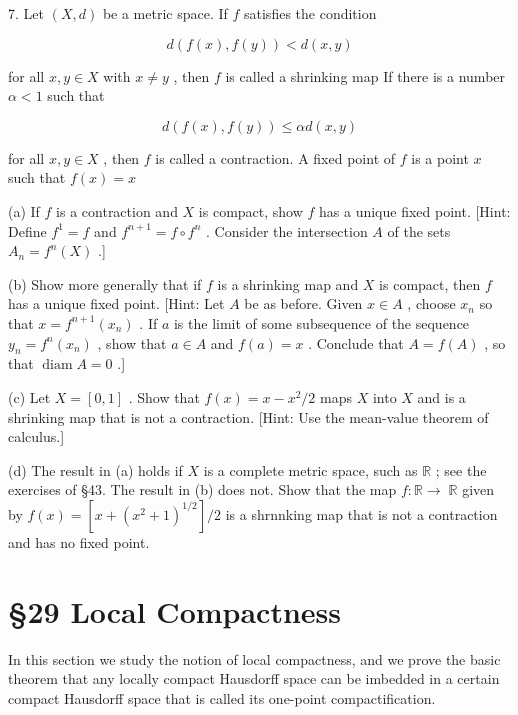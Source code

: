 \documentclass[10pt]{article}
\begin{document}
7. Let \(\left( {X,d}\right)\) be a metric space. If \(f\) satisfies the condition

\[
d\left( {f\left( x\right) ,f\left( y\right) }\right)  < d\left( {x,y}\right)
\]

for all \(x,y \in  X\) with \(x \neq  y\) , then \(f\) is called a shrinking map If there is a number \(\alpha  < 1\) such that

\[
d\left( {f\left( x\right) ,f\left( y\right) }\right)  \leq  {\alpha d}\left( {x,y}\right)
\]

for all \(x,y \in  X\) , then \(f\) is called a contraction. A fixed point of \(f\) is a point \(x\) such that \(f\left( x\right)  = x\)

(a) If \(f\) is a contraction and \(X\) is compact, show \(f\) has a unique fixed point. [Hint: Define \({f}^{1} = f\) and \({f}^{n + 1} = f \circ  {f}^{n}\) . Consider the intersection \(A\) of the sets \({A}_{n} = {f}^{n}\left( X\right)\) .]

(b) Show more generally that if \(f\) is a shrinking map and \(X\) is compact, then \(f\) has a unique fixed point. [Hint: Let \(A\) be as before. Given \(x \in  A\) , choose \({x}_{n}\) so that \(x = {f}^{n + 1}\left( {x}_{n}\right)\) . If \(a\) is the limit of some subsequence of the sequence \({y}_{n} = {f}^{n}\left( {x}_{n}\right)\) , show that \(a \in  A\) and \(f\left( a\right)  = x\) . Conclude that \(A = f\left( A\right)\) , so that \(\operatorname{diam}A = 0\) .]

(c) Let \(X = \left\lbrack  {0,1}\right\rbrack\) . Show that \(f\left( x\right)  = x - {x}^{2}/2\) maps \(X\) into \(X\) and is a shrinking map that is not a contraction. [Hint: Use the mean-value theorem of calculus.]

(d) The result in (a) holds if \(X\) is a complete metric space, such as \(\mathbb{R}\) ; see the exercises of §43. The result in (b) does not. Show that the map \(f : \mathbb{R} \rightarrow \; \mathbb{R}\) given by \(f\left( x\right)  = \left\lbrack  {x + {\left( {x}^{2} + 1\right) }^{1/2}}\right\rbrack  /2\) is a shrnnking map that is not a contraction and has no fixed point.

\section*{§29 Local Compactness}

In this section we study the notion of local compactness, and we prove the basic theorem that any locally compact Hausdorff space can be imbedded in a certain compact Hausdorff space that is called its one-point compactification.
\end{document}
